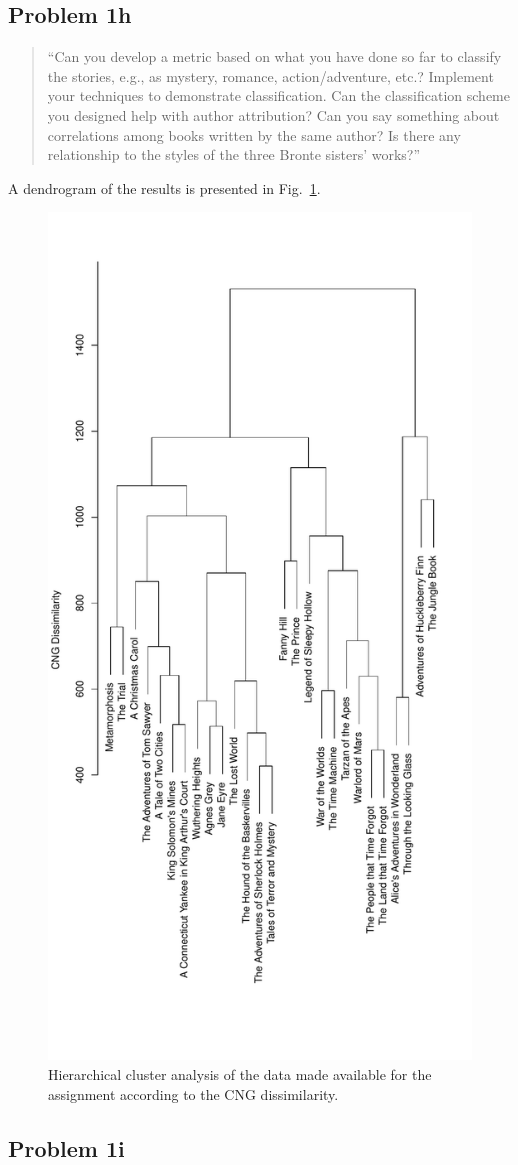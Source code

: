 \documentclass[conference]{IEEEtran}
\newcommand{\codefile}[1]{
  \begin{framed}
  \fontsize{5.65}{6.78}\selectfont
  
  \end{framed}
}
\begin{document}
\subsection{Problem 1h}

\begin{quote}
``Can you develop a metric based on what you have done so far to classify the stories, e.g., 
as mystery, romance, action/adventure, etc.? Implement your techniques to demonstrate 
classification. Can the classification scheme you designed help with author attribution? 
Can you say something about correlations among books written by the same author? 
Is there any relationship to the styles of the three Bronte sisters' works?''
\end{quote}

\codefile{problem1h.py}

A dendrogram of the results is presented in Fig.~\ref{fig:problem1h}.

\begin{figure}[!t]
\centering
\includegraphics[height=\textwidth,angle=270]{problem1h}
\caption{Hierarchical cluster analysis of the data made available for the assignment
according to the CNG dissimilarity.}
\label{fig:problem1h}
\end{figure}

\subsection{Problem 1i}
\end{document}
